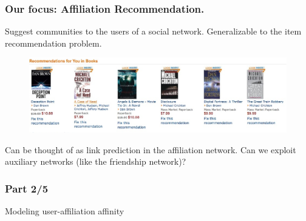 \documentclass[handout]{beamer}
\begin{document}
\begin{frame}
\frametitle{Our focus: Affiliation Recommendation.}
\begin{itemize}
\pitem Suggest communities to the users of a social network.
\pitem Generalizable to the item recommendation problem.
\begin{figure}
\includegraphics[scale=0.25]{../talk/figures/amazonRecommendations.eps}
\end{figure}
\pitem Can be thought of as link prediction in the affiliation network.
\pitem Can we exploit auxiliary networks (like the friendship network)?
\end{itemize}
\end{frame}

\begin{frame}
\frametitle{Part 2/5}
  \hspace{1.1in}
  \centerline{\huge{Modeling user-affiliation affinity}}
\end{frame}
\end{document}
